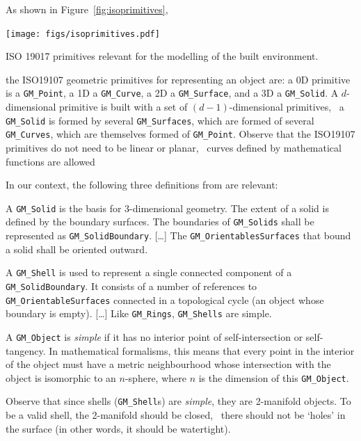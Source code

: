 As shown in Figure~\ref{fig:isoprimitives}, 
\begin{marginfigure}
  \centering
  \texttt{[image: figs/isoprimitives.pdf]}
  \caption{ISO 19017 primitives relevant for the modelling of the built environment.}%
\label{fig:isoprimitives}
\end{marginfigure}
the ISO19107 geometric primitives for representing an object are: a 0D primitive is a \texttt{GM\_Point}, a 1D a \texttt{GM\_Curve}, a 2D a \texttt{GM\_Surface}, and a 3D a \texttt{GM\_Solid}.
A $d$-dimensional primitive is built with a set of $(d-1)$-dimensional primitives, \eg\ a \texttt{GM\_Solid} is formed by several \texttt{GM\_Surfaces}, which are formed of several \texttt{GM\_Curves}, which are themselves formed of \texttt{GM\_Point}.
Observe that the ISO19107 primitives do not need to be linear or planar, \ie\ curves defined by mathematical functions are allowed

%

In our context, the following three definitions from \citet{ISO19107} are relevant:
\begin{definition}
A \texttt{GM\_Solid} is the basis for 3-dimensional geometry. 
The extent of a solid is defined by the boundary surfaces.
The boundaries of \texttt{GM\_Solids} shall be represented as \texttt{GM\_SolidBoundary}.
[\ldots] 
The \texttt{GM\_OrientablesSurfaces} that bound a solid shall be oriented outward.
\end{definition}
\begin{definition}
A \texttt{GM\_Shell} is used to represent a single connected component of a \texttt{GM\_SolidBoundary}. 
It consists of a number of references to \texttt{GM\_OrientableSurfaces} connected in a topological cycle (an object whose boundary is empty). 
[\ldots] 
Like \texttt{GM\_Rings}, \texttt{GM\_Shells} are simple.
\end{definition}
\begin{definition}
A \texttt{GM\_Object} is \emph{simple} if it has no interior point of self-intersection or self-tangency. 
In mathematical formalisms, this means that every point in the interior of the object must have a metric neighbourhood whose intersection with the object is isomorphic to an $n$-sphere, where $n$ is the dimension of this \texttt{GM\_Object}.
\end{definition}

%

Observe that since shells (\texttt{GM\_Shell}s) are \emph{simple}, they are 2-manifold objects.
To be a valid shell, the 2-manifold should be closed, \ie\ there should not be `holes' in the surface (in other words, it should be watertight).

